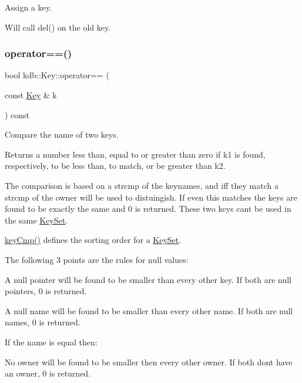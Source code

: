 Assign a key. 

Will call del() on the old key. \mbox{\label{classkdb_1_1Key_ae52e7f4c4461db5356ddeef64a870cad}} 
\subsubsection{\texorpdfstring{operator==()}{operator==()}}
{\footnotesize\ttfamily bool kdb\+::\+Key\+::operator== (\begin{DoxyParamCaption}\item[{const \mbox{\hyperlink{classkdb_1_1Key}{Key}} \&}]{k }\end{DoxyParamCaption}) const\hspace{0.3cm}{\ttfamily [inline]}}



Compare the name of two keys. 

\begin{DoxyReturn}{Returns}
a number less than, equal to or greater than zero if k1 is found, respectively, to be less than, to match, or be greater than k2.
\end{DoxyReturn}
The comparison is based on a strcmp of the keynames, and iff they match a strcmp of the owner will be used to distuingish. If even this matches the keys are found to be exactly the same and 0 is returned. These two keys can\textquotesingle{}t be used in the same \mbox{\hyperlink{classkdb_1_1KeySet}{Key\+Set}}.

\mbox{\hyperlink{group__keytest_gaf6e66e12fe04d535a5d1c8218ced803e}{key\+Cmp()}} defines the sorting order for a \mbox{\hyperlink{classkdb_1_1KeySet}{Key\+Set}}.

The following 3 points are the rules for null values\+:


\begin{DoxyItemize}
\item A null pointer will be found to be smaller than every other key. If both are null pointers, 0 is returned.
\item A null name will be found to be smaller than every other name. If both are null names, 0 is returned.
\end{DoxyItemize}

If the name is equal then\+:


\begin{DoxyItemize}
\item No owner will be found to be smaller then every other owner. If both don\textquotesingle{}t have an owner, 0 is returned.
\end{DoxyItemize}

